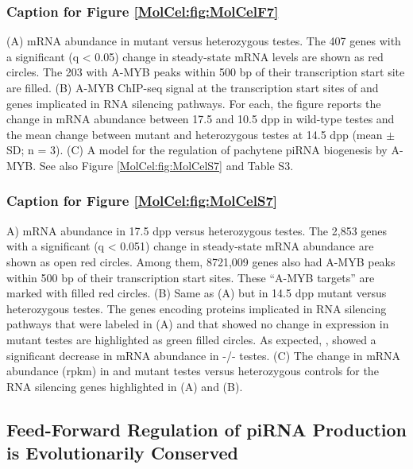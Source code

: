       \subsubsection{Caption for Figure \ref{MolCel:fig:MolCelF7}}
        \label{MolCel:subsubsection:cap:Figure F7}
        (A) mRNA abundance in \amyb{} mutant versus heterozygous testes. The 407 genes with a significant (q < 0.05) change in steady-state mRNA levels are shown as red circles. The 203 with A-MYB peaks within 500 bp of their transcription start site are filled.
        (B) A-MYB ChIP-seq signal at the transcription start sites of \amyb{} and genes implicated in RNA silencing pathways. For each, the figure reports the change in mRNA abundance between 17.5 and 10.5 dpp in wild-type testes and the mean change between \amyb{} mutant and heterozygous testes at 14.5 dpp (mean $\pm$ SD; n = 3).
        (C) A model for the regulation of pachytene piRNA biogenesis by A-MYB. See also Figure \ref{MolCel:fig:MolCelS7} and Table S3.

      \subsubsection{Caption for Figure \ref{MolCel:fig:MolCelS7}}
        \label{MolCel:subsubsection:cap:Figure S7}
        A) mRNA abundance in 17.5 dpp \amyb{} versus heterozygous testes. The 2,853 genes with a significant (q < 0.051) change in steady-state mRNA abundance are shown as open red circles. Among them, 8721,009 genes also had A-MYB peaks within 500 bp of their transcription start sites. These ``A-MYB targets'' are marked with filled red circles. (B) Same as (A) but in 14.5 dpp \miwi{} mutant versus heterozygous testes. The genes encoding proteins implicated in RNA silencing pathways that were labeled in (A) and that showed no change in expression in \miwi{} mutant testes are highlighted as green filled circles. As expected, \miwi{}, showed a significant decrease in mRNA abundance in \miwi{}-/- testes. (C) The change in mRNA abundance (rpkm) in \amyb{} and \miwi{} mutant testes versus heterozygous controls for the RNA silencing genes highlighted in (A) and (B).

  \subsection{Feed-Forward Regulation of piRNA Production is Evolutionarily Conserved}
    \label{MolCel:subsec:A-MYB in Chickens}

